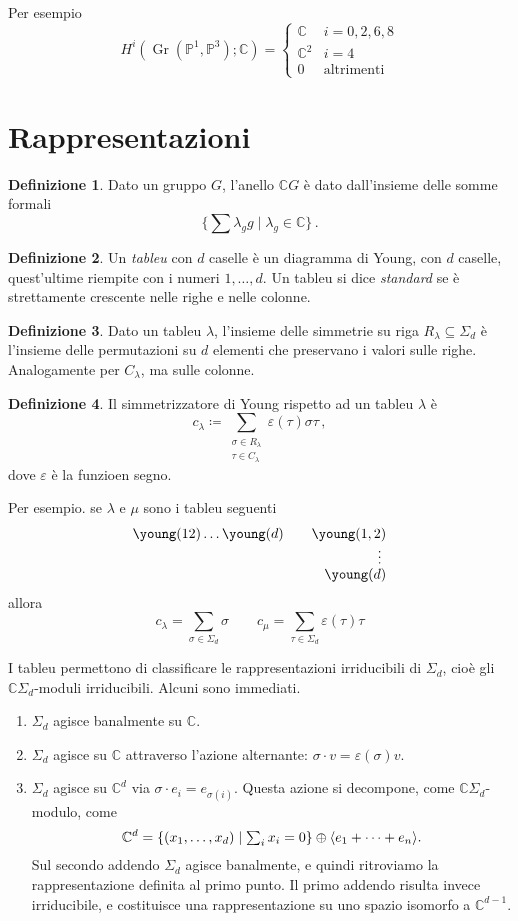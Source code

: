 \documentclass[a4paper, 11pt]{article}
\theoremstyle{definition}
\newtheorem{Def}{Definizione}[section]
\theoremstyle{plain}
\DeclarePairedDelimiter{\ang}{\langle}{\rangle}
\renewcommand{\epsilon}{\varepsilon}
\newcommand{\PP}{\mathbb{P}}
\newcommand{\C}{\mathbb{C}}
\newcommand{\deff}{\coloneqq}
\DeclareMathOperator{\Gr}{Gr}
\begin{document}
Per esempio
\[
	H^i(\Gr(\PP^1, \PP^3);\C) = 
	\begin{cases}
		\C & i = 0,2,6,8\\
		\C^2 & i = 4\\
		0 &\text{altrimenti}
	\end{cases}
\]
\section{Rappresentazioni}

\begin{Def}
	Dato un gruppo $G$, l'anello $ \C G$ è dato dall'insieme delle somme formali 
	\[
		\{\sum \lambda_g g \mid \lambda_g \in \C\}\,.
	\]
\end{Def}
\begin{Def}
	Un \emph{tableu} con $d$ caselle è un diagramma di Young, con $d$ caselle, quest'ultime riempite con i numeri $1, \dots, d$. Un tableu si dice \emph{standard} se è strettamente crescente nelle righe e nelle colonne.
\end{Def}
\begin{Def}
	Dato un tableu $\lambda$, l'insieme delle simmetrie su riga $R_\lambda \subseteq \Sigma_d$ è l'insieme delle permutazioni su $d$ elementi che preservano i valori sulle righe. Analogamente per $C_\lambda$, ma sulle colonne.
\end{Def}
\begin{Def}
	Il simmetrizzatore di Young rispetto ad un tableu $\lambda$ è
	\[
		c_\lambda \deff \sum_{\substack{\sigma \in R_\lambda \\ \tau \in C_\lambda}}\epsilon(\tau)\sigma\tau\,,
	\]
	dove $\epsilon$ è la funzioen segno.
\end{Def}

Per esempio. se $\lambda$ e $\mu$ sono i tableu seguenti
\[
\begin{split}
	\young(12)\dots\young(d) \qquad \young(1,2)&\\[-1ex]
	\vdots\ & \\[-1ex]
	\young(d)&
\end{split}
\]
allora 
\[
	c_\lambda = \sum_{\sigma \in \Sigma_d} \sigma \qquad c_\mu = \sum_{\tau \in \Sigma_d}\epsilon(\tau)\tau
\]

I tableu permettono di classificare le rappresentazioni irriducibili di $\Sigma_d$, cioè gli $\C \Sigma_d$-moduli irriducibili. Alcuni sono immediati.
\begin{enumerate}
	\item $\Sigma_d$ agisce banalmente su $\C$.
	\item $\Sigma_d$ agisce su $\C$ attraverso l'azione alternante: $\sigma \cdot v = \epsilon(\sigma)v$.
	\item $\Sigma_d$ agisce su $\C^d$ via $\sigma \cdot e_i = e_{\sigma(i)}$. Questa azione si decompone, come $\C \Sigma_d$-modulo, come
	\[
		\C^d = \{(x_1, \dots, x_d) \mid \textstyle \sum_i x_i = 0\} \oplus \ang{e_1 + \dots + e_n}.
	\]
	Sul secondo addendo $\Sigma_d$ agisce banalmente, e quindi ritroviamo la rappresentazione definita al primo punto. Il primo addendo risulta invece irriducibile, e costituisce una rappresentazione su uno spazio isomorfo a $\C^{d-1}$.
\end{enumerate}
\end{document}
